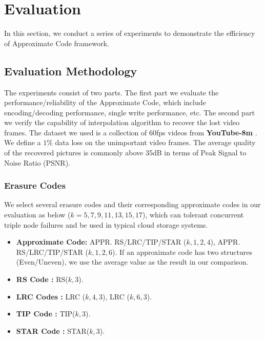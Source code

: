 \documentclass[sigconf]{acmart}
\begin{document}
\section{Evaluation}\label{evaluation}
In this section, we conduct a series of experiments to demonstrate the efficiency of Approximate Code framework.

\subsection{Evaluation Methodology}
The experiments consist of two parts. The first part we evaluate the performance/reliability of the Approximate Code, which include encoding/decoding performance, single write performance, etc. The second part we verify the capability of interpolation algorithm to recover the lost video frames. The dataset we used is a collection of 60fps videos from \textbf{YouTube-8m} \cite{youtube8m}. We define a $1\%$ data loss on the unimportant video frames. The average quality of the recovered pictures is commonly above 35dB in terms of Peak Signal to Noise Ratio (PSNR). 



\subsubsection{Erasure Codes}
We select several erasure codes and their corresponding approximate codes in our evaluation as below ($k = 5,7,9,11,13,15,17$), which can tolerant concurrent triple node failures and be used in typical cloud storage systems.
\begin{itemize}
    \item \textbf{Approximate Code:} APPR. RS/LRC/TIP/STAR ($k,1,2,4$), APPR. RS/LRC/TIP/STAR ($k,1,2,6$). If an approximate code has two structures (Even/Uneven), we use the average value as the result in our comparison.
    \item \textbf{RS Code \cite{RS}:} RS($k,3$).
    \item \textbf{LRC Codes \cite{LRC}:} LRC ($k,4,3$), LRC ($k,6,3$). 
    \item \textbf{TIP Code \cite{TIP}:} TIP($k,3$). 
    \item \textbf{STAR Code \cite{STAR}:} STAR($k,3$).
\end{itemize}
\end{document}
